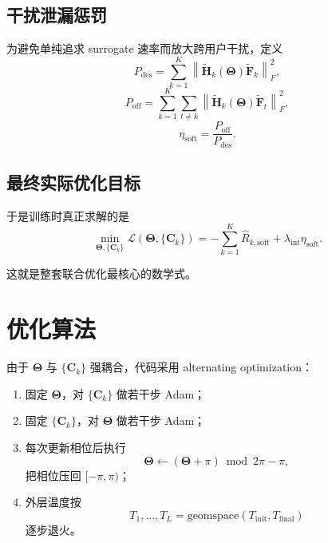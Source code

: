 \documentclass[11pt]{ctexart}
\begin{document}
\subsection{干扰泄漏惩罚}
为避免单纯追求 surrogate 速率而放大跨用户干扰，定义
\begin{equation}
    P_{\mathrm{des}}
    =
    \sum_{k=1}^{K}
    \left\|
        \widetilde{\bm{H}}_k(\bm{\Theta})
        \widetilde{\bm{F}}_k
    \right\|_F^2,
\end{equation}
\begin{equation}
    P_{\mathrm{off}}
    =
    \sum_{k=1}^{K}
    \sum_{t\ne k}
    \left\|
        \widetilde{\bm{H}}_k(\bm{\Theta})
        \widetilde{\bm{F}}_t
    \right\|_F^2,
\end{equation}
\begin{equation}
    \eta_{\mathrm{soft}}
    =
    \frac{P_{\mathrm{off}}}{P_{\mathrm{des}}}.
\end{equation}

\subsection{最终实际优化目标}
于是训练时真正求解的是
\begin{equation}
    \boxed{
    \min_{\bm{\Theta},\{\bm{C}_k\}}
    \mathcal{L}(\bm{\Theta},\{\bm{C}_k\})
    =
    -
    \sum_{k=1}^{K}\widehat{R}_{k,\mathrm{soft}}
    +
    \lambda_{\mathrm{int}}\eta_{\mathrm{soft}}
    }.
\end{equation}

这就是整套联合优化最核心的数学式。

\section{优化算法}
由于 $\bm{\Theta}$ 与 $\{\bm{C}_k\}$ 强耦合，代码采用 alternating optimization：
\begin{enumerate}
    \item 固定 $\bm{\Theta}$，对 $\{\bm{C}_k\}$ 做若干步 Adam；
    \item 固定 $\{\bm{C}_k\}$，对 $\bm{\Theta}$ 做若干步 Adam；
    \item 每次更新相位后执行
    \begin{equation}
        \bm{\Theta}
        \leftarrow
        (\bm{\Theta}+\pi)\bmod 2\pi - \pi,
    \end{equation}
    把相位压回 $[-\pi,\pi)$；
    \item 外层温度按
    \begin{equation}
        T_1,\ldots,T_L
        =
        \mathrm{geomspace}(T_{\mathrm{init}},T_{\mathrm{final}})
    \end{equation}
    逐步退火。
\end{enumerate}
\end{document}

